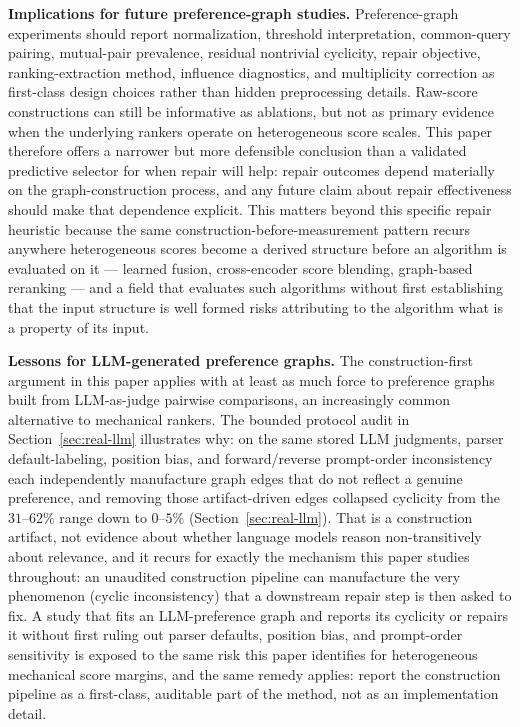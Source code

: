 \documentclass[manuscript,anonymous,review]{acmart}
\begin{document}
\textbf{Implications for future preference-graph studies.} Preference-graph
experiments should report normalization, threshold interpretation, common-query
pairing, mutual-pair prevalence, residual nontrivial cyclicity, repair
objective, ranking-extraction method, influence diagnostics, and multiplicity
correction as first-class design choices rather than hidden preprocessing
details. Raw-score constructions can still be informative as ablations, but not
as primary evidence when the underlying rankers operate on heterogeneous score
scales. This paper therefore offers a narrower but more defensible conclusion
than a validated predictive selector for when repair will help: repair
outcomes depend materially on the graph-construction process, and any future
claim about repair effectiveness should make that dependence explicit. This
matters beyond this specific repair heuristic because the same
construction-before-measurement pattern recurs anywhere heterogeneous scores
become a derived structure before an algorithm is evaluated on it --- learned
fusion, cross-encoder score blending, graph-based reranking --- and a field
that evaluates such algorithms without first establishing that the input
structure is well formed risks attributing to the algorithm what is a
property of its input.

\textbf{Lessons for LLM-generated preference graphs.} The construction-first
argument in this paper applies with at least as much force to preference
graphs built from LLM-as-judge pairwise comparisons, an increasingly common
alternative to mechanical rankers. The bounded protocol audit in
Section~\ref{sec:real-llm} illustrates why: on the same stored LLM
judgments, parser default-labeling, position bias, and forward/reverse
prompt-order inconsistency each independently manufacture graph edges that
do not reflect a genuine preference, and removing those artifact-driven
edges collapsed cyclicity from the $31$--$62\%$ range down to $0$--$5\%$
(Section~\ref{sec:real-llm}). That is a construction artifact, not evidence
about whether language models reason non-transitively about relevance,
and it recurs for exactly the mechanism this paper studies throughout:
an unaudited construction pipeline can manufacture the very phenomenon
(cyclic inconsistency) that a downstream repair step is then asked to fix.
A study that fits an LLM-preference graph and reports its cyclicity or
repairs it without first ruling out parser defaults, position bias, and
prompt-order sensitivity is exposed to the same risk this paper identifies
for heterogeneous mechanical score margins, and the same remedy applies:
report the construction pipeline as a first-class, auditable part of the
method, not as an implementation detail.
\end{document}

